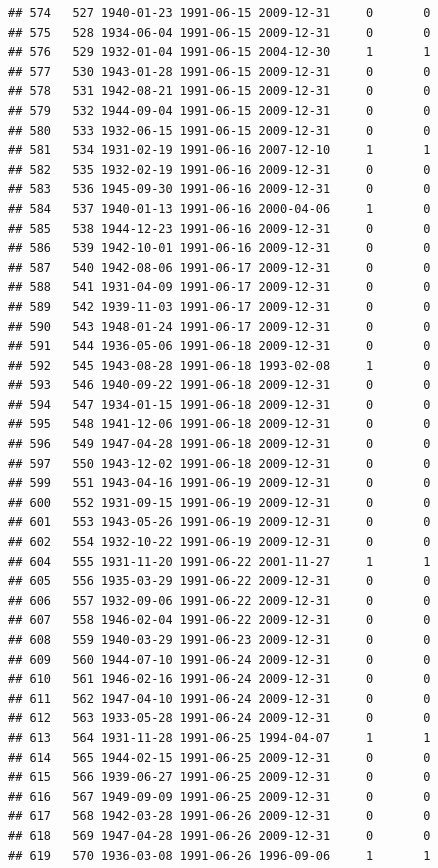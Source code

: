 \documentclass[
]{book}
\theoremstyle{definition}
\theoremstyle{definition}
\theoremstyle{definition}
\theoremstyle{definition}
\theoremstyle{remark}
\begin{document}
\begin{verbatim}
## 574   527 1940-01-23 1991-06-15 2009-12-31     0       0
## 575   528 1934-06-04 1991-06-15 2009-12-31     0       0
## 576   529 1932-01-04 1991-06-15 2004-12-30     1       1
## 577   530 1943-01-28 1991-06-15 2009-12-31     0       0
## 578   531 1942-08-21 1991-06-15 2009-12-31     0       0
## 579   532 1944-09-04 1991-06-15 2009-12-31     0       0
## 580   533 1932-06-15 1991-06-15 2009-12-31     0       0
## 581   534 1931-02-19 1991-06-16 2007-12-10     1       1
## 582   535 1932-02-19 1991-06-16 2009-12-31     0       0
## 583   536 1945-09-30 1991-06-16 2009-12-31     0       0
## 584   537 1940-01-13 1991-06-16 2000-04-06     1       0
## 585   538 1944-12-23 1991-06-16 2009-12-31     0       0
## 586   539 1942-10-01 1991-06-16 2009-12-31     0       0
## 587   540 1942-08-06 1991-06-17 2009-12-31     0       0
## 588   541 1931-04-09 1991-06-17 2009-12-31     0       0
## 589   542 1939-11-03 1991-06-17 2009-12-31     0       0
## 590   543 1948-01-24 1991-06-17 2009-12-31     0       0
## 591   544 1936-05-06 1991-06-18 2009-12-31     0       0
## 592   545 1943-08-28 1991-06-18 1993-02-08     1       0
## 593   546 1940-09-22 1991-06-18 2009-12-31     0       0
## 594   547 1934-01-15 1991-06-18 2009-12-31     0       0
## 595   548 1941-12-06 1991-06-18 2009-12-31     0       0
## 596   549 1947-04-28 1991-06-18 2009-12-31     0       0
## 597   550 1943-12-02 1991-06-18 2009-12-31     0       0
## 599   551 1943-04-16 1991-06-19 2009-12-31     0       0
## 600   552 1931-09-15 1991-06-19 2009-12-31     0       0
## 601   553 1943-05-26 1991-06-19 2009-12-31     0       0
## 602   554 1932-10-22 1991-06-19 2009-12-31     0       0
## 604   555 1931-11-20 1991-06-22 2001-11-27     1       1
## 605   556 1935-03-29 1991-06-22 2009-12-31     0       0
## 606   557 1932-09-06 1991-06-22 2009-12-31     0       0
## 607   558 1946-02-04 1991-06-22 2009-12-31     0       0
## 608   559 1940-03-29 1991-06-23 2009-12-31     0       0
## 609   560 1944-07-10 1991-06-24 2009-12-31     0       0
## 610   561 1946-02-16 1991-06-24 2009-12-31     0       0
## 611   562 1947-04-10 1991-06-24 2009-12-31     0       0
## 612   563 1933-05-28 1991-06-24 2009-12-31     0       0
## 613   564 1931-11-28 1991-06-25 1994-04-07     1       1
## 614   565 1944-02-15 1991-06-25 2009-12-31     0       0
## 615   566 1939-06-27 1991-06-25 2009-12-31     0       0
## 616   567 1949-09-09 1991-06-25 2009-12-31     0       0
## 617   568 1942-03-28 1991-06-26 2009-12-31     0       0
## 618   569 1947-04-28 1991-06-26 2009-12-31     0       0
## 619   570 1936-03-08 1991-06-26 1996-09-06     1       1

\end{verbatim}
\end{document}
